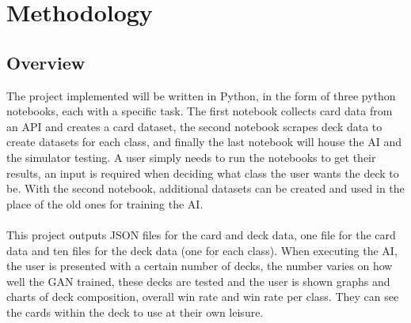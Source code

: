\documentclass{report} %
\begin{document}
\chapter{Methodology}
\section{Overview}
The project implemented will be written in Python, in the form of three python notebooks, each with a specific task. The first notebook collects card data from an API and creates a card dataset, the second notebook scrapes deck data to create datasets for each class, and finally the last notebook will house the AI and the simulator testing. A user simply needs to run the notebooks to get their results, an input is required when deciding what class the user wants the deck to be. With the second notebook, additional datasets can be created and used in the place of the old ones for training the AI. \\ \\
This project outputs JSON files for the card and deck data, one file for the card data and ten files for the deck data (one for each class). When executing the AI, the user is presented with a certain number of decks, the number varies on how well the GAN trained, these decks are tested and the user is shown graphs and charts of deck composition, overall win rate and win rate per class. They can see the cards within the deck to use at their own leisure.

	
\end{document}
